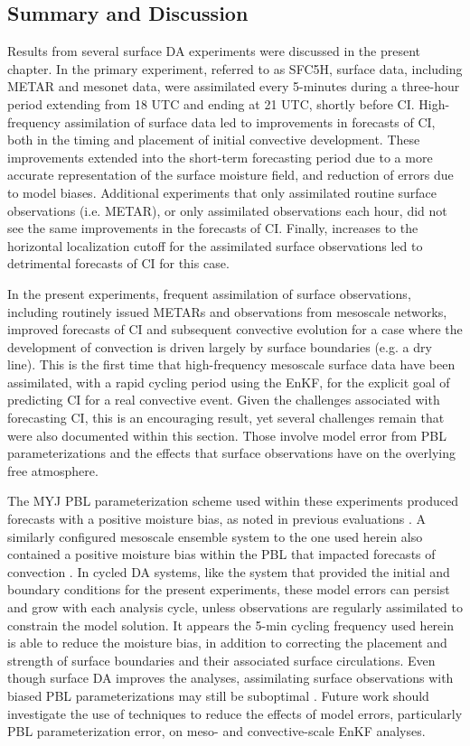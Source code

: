 \subsection{Summary and Discussion}
Results from several surface DA experiments were discussed in the present chapter. In the primary experiment, referred to as SFC5H, surface data, including METAR and mesonet data, were assimilated every 5-minutes during a three-hour period extending from 18 UTC and ending at 21 UTC, shortly before CI. High-frequency assimilation of surface data led to improvements in forecasts of CI, both in the timing and placement of initial convective development. These improvements extended into the short-term forecasting period due to a more accurate representation of the surface moisture field, and reduction of errors due to model biases. Additional experiments that only assimilated routine surface observations (i.e. METAR), or only assimilated observations each hour, did not see the same improvements in the forecasts of CI. Finally, increases to the horizontal localization cutoff for the assimilated surface observations led to detrimental forecasts of CI for this case.

In the present experiments, frequent assimilation of surface observations, including routinely issued METARs and observations from mesoscale networks, improved forecasts of CI and subsequent convective evolution for a case where the development of convection is driven largely by surface boundaries (e.g. a dry line). This is the first time that high-frequency mesoscale surface data have been assimilated, with a rapid cycling period using the EnKF, for the explicit goal of predicting CI for a real convective event. Given the challenges associated with forecasting CI, this is an encouraging result, yet several challenges remain that were also documented within this section. Those involve model error from PBL parameterizations and the effects that surface observations have on the overlying free atmosphere.

The MYJ PBL parameterization scheme used within these experiments produced forecasts with a positive moisture bias, as noted in previous evaluations \citep{huetal10}. A similarly configured mesoscale ensemble system to the one used herein also contained a positive moisture bias within the PBL that impacted forecasts of convection \citep{romineetal13}. In cycled DA systems, like the system that provided the initial and boundary conditions for the present experiments, these model errors can persist and grow with each analysis cycle, unless observations are regularly assimilated to constrain the model solution. It appears the 5-min cycling frequency used herein is able to reduce the moisture bias, in addition to correcting the placement and strength of surface boundaries and their associated surface circulations. Even though surface DA improves the analyses, assimilating surface observations with biased PBL parameterizations may still be suboptimal \citep{deedasilva98}. Future work should investigate the use of techniques to reduce the effects of model errors, particularly PBL parameterization error, on meso- and convective-scale EnKF analyses.

